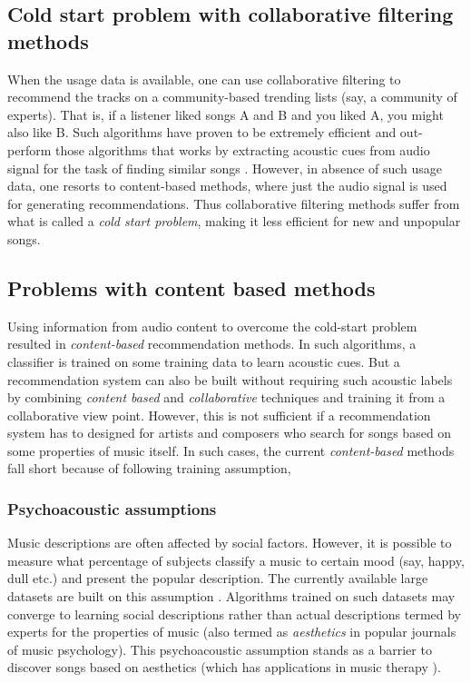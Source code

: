 \subsection{Cold start problem with collaborative filtering methods}
When the usage data is available, one can use collaborative filtering to recommend the tracks on a community-based trending lists (say, a community of experts). That is, if a listener liked songs A and B and you liked A, you might also like B. Such algorithms have proven to be extremely efficient and out-perform those algorithms that works by extracting acoustic cues from audio signal for the task of finding similar songs \cite{DC1}. However, in absence of such usage data, one resorts to content-based methods, where just the audio signal is used for generating recommendations. Thus collaborative filtering methods suffer from what is called a \textit{cold start problem}, making it less efficient for new and unpopular songs. 


\subsection{Problems with content based methods}
\label{problems}
Using information from audio content to overcome the cold-start problem resulted in \textit{content-based} recommendation methods. In such algorithms, a classifier is trained on some training data to learn acoustic cues. But a recommendation system can also be built without requiring  such acoustic labels by combining \textit{content based} and \textit{collaborative} techniques\cite{combining} and training it from a collaborative view point. However, this is not sufficient if a recommendation system has to designed for artists and composers who search for songs based on some properties of music itself. In such cases, the current \textit{content-based} methods fall short because of following training assumption,   

\subsubsection{Psychoacoustic assumptions}
Music descriptions are often affected by social factors. However, it is possible to measure what percentage of subjects classify a music to certain mood (say, happy, dull etc.) and present the popular description. The currently available large datasets are built on this assumption \cite{MSD}\cite{MTT}. Algorithms trained on such datasets may converge to learning social descriptions rather than actual descriptions termed by experts for the properties of music (also termed as \textit{aesthetics} in popular journals of music psychology\cite{NoAccountingForTaste}). This psychoacoustic assumption stands as a barrier to discover songs based on aesthetics (which has applications in music therapy \cite{MusicTherapy}).

